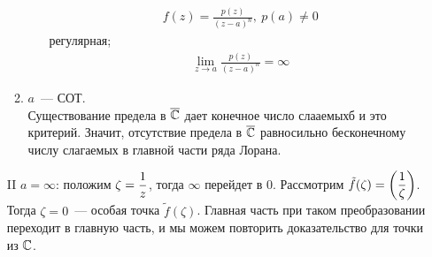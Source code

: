 \begin{itemize}
\begin{enumerate}
\begin{itemize}
\begin{align*}
              f(z) = \frac{p(z)}{(z-a)^n}, \ p(a) \neq 0
            \end{align*}
            регулярная;
            \begin{align*}
              \lim_{z \to a} \frac{p(z)}{(z-a)^n} = \infty
            \end{align*}         
        \end{itemize}
        \item $a$~--- СОТ.
        \\
        Существование предела в $\overline{\mathbb{C}}$ дает конечное число слааемыхб и это
        критерий. Значит, отсутствие предела в $\overline{\mathbb{C}}$ равносильно бесконечному
        числу слагаемых в главной части ряда Лорана.
        \end{enumerate}
    \item[II] $a = \infty$: положим $\zeta = \displaystyle \frac{1}{z}$, тогда $\infty$
    перейдет в $0$. Рассмотрим $\tilde{f}(\zeta) = \left( \displaystyle \frac{1}{\zeta}
    \right)$. Тогда $\zeta = 0$~--- особая точка $\tilde{f}(\zeta)$. Главная
    часть при таком преобразовании переходит в главную часть, и мы можем
    повторить доказательство для точки из $\mathbb{C}$.
\end{itemize} 